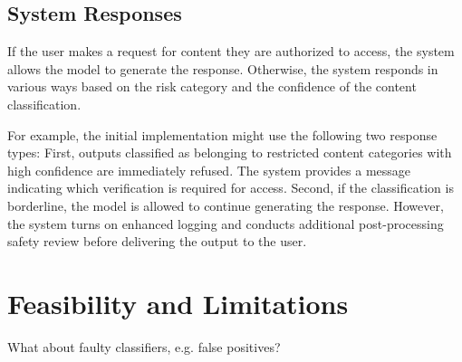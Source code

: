 \documentclass{article}
\theoremstyle{plain}
\theoremstyle{definition}
\theoremstyle{remark}
\begin{document}
\subsection{System Responses} \label{section:system-responses}

If the user makes a request for content they are authorized to access, the system allows the model to generate the response.
Otherwise, the system responds in various ways based on the risk category and the confidence of the content classification.

For example, the initial implementation might use the following two response types:
First, outputs classified as belonging to restricted content categories with high confidence are immediately refused.
The system provides a message indicating which verification is required for access.
Second, if the classification is borderline, the model is allowed to continue generating the response.
However, the system turns on enhanced logging and conducts additional post-processing safety review before delivering the output to the user.

\section{Feasibility and Limitations}
\label{section:feasibility-and-limitations}


What about faulty classifiers, e.g. false positives?
\end{document}
